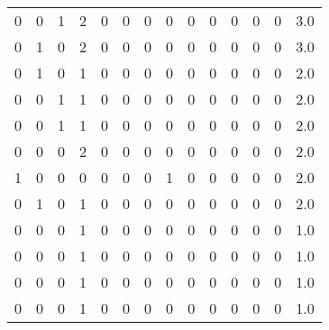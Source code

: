 \begin{tabular}{rrrrrrrrrrrrrr}
       0 &       0 &          1 &               2 &                0 &       0 &          0 &          0 &         0 &         0 &      0 &             0 &         0 &      3.0 \\
       0 &       1 &          0 &               2 &                0 &       0 &          0 &          0 &         0 &         0 &      0 &             0 &         0 &      3.0 \\
       0 &       1 &          0 &               1 &                0 &       0 &          0 &          0 &         0 &         0 &      0 &             0 &         0 &      2.0 \\
       0 &       0 &          1 &               1 &                0 &       0 &          0 &          0 &         0 &         0 &      0 &             0 &         0 &      2.0 \\
       0 &       0 &          1 &               1 &                0 &       0 &          0 &          0 &         0 &         0 &      0 &             0 &         0 &      2.0 \\
       0 &       0 &          0 &               2 &                0 &       0 &          0 &          0 &         0 &         0 &      0 &             0 &         0 &      2.0 \\
       1 &       0 &          0 &               0 &                0 &       0 &          0 &          1 &         0 &         0 &      0 &             0 &         0 &      2.0 \\
       0 &       1 &          0 &               1 &                0 &       0 &          0 &          0 &         0 &         0 &      0 &             0 &         0 &      2.0 \\
       0 &       0 &          0 &               1 &                0 &       0 &          0 &          0 &         0 &         0 &      0 &             0 &         0 &      1.0 \\
       0 &       0 &          0 &               1 &                0 &       0 &          0 &          0 &         0 &         0 &      0 &             0 &         0 &      1.0 \\
       0 &       0 &          0 &               1 &                0 &       0 &          0 &          0 &         0 &         0 &      0 &             0 &         0 &      1.0 \\
       0 &       0 &          0 &               1 &                0 &       0 &          0 &          0 &         0 &         0 &      0 &             0 &         0 &      1.0 \\

\end{tabular}
